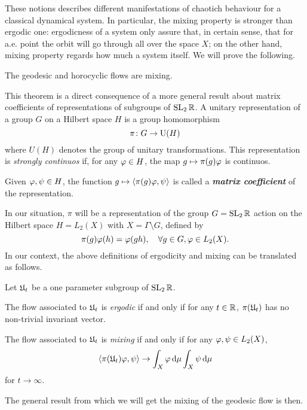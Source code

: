 These notions describes different manifestations of chaotich behaviour for a classical dynamical system. In particular, the mixing property is stronger than ergodic one: ergodicness of a system only assure that, in certain sense, that for a.e. point the orbit will go through all over the space $X$; on the other hand, mixing property regards how much a system  itself. We will prove the following.

\begin{nteo}
\label{teo:geod_horo_are_mixing}
The geodesic and horocyclic flows are mixing.
\end{nteo}

This theorem is a direct consequence of a more general result about matrix coefficients of representations of subgroups of $\operatorname{SL}_{2}\mathbb{R}$. A unitary representation of a group $G$ on a Hilbert space $H$ is a group homomorphism
\[
\pi\colon G\to\operatorname{U}(H)
\]
where $U(H)$ denotes the group of unitary transformations. This representation is \emph{strongly continuos} if, for any $\varphi\in H$, the map $g\mapsto\pi(g)\varphi$ is continuos. 
\begin{defin}
Given $\varphi,\psi\in H$, the function $g\mapsto\left< \pi(g)\varphi,\psi\right>$ is called a \emph{\textbf{matrix coefficient}} of the representation.
\end{defin}
In our situation, $\pi$ will be a representation of the group $G=\operatorname{SL}_{2}\mathbb{R}$ action on the Hilbert space $H=L_{2}(X)$ with $X=\Gamma\setminus G$, defined by 
\[
\pi(g)\varphi(h)=\varphi(gh),\quad\forall g\in G,\varphi\in L_{2}(X).
\]
In our context, the above definitions of ergodicity and mixing can be translated as follows.

\begin{defin}
Let $\mathfrak{U}_{t}$ be a one parameter subgroup of $\operatorname{SL}_{2}\mathbb{R}$.
\begin{compactitem}
\item The flow associated to $\mathfrak{U}_{t}$ is \emph{ergodic} if and only if for any $t\in\mathbb{R}$, $\pi(\mathfrak{U}_{t})$ has no non-trivial invariant vector.
\item The flow associated to $\mathfrak{U}_{t}$ is \emph{mixing} if and only if for any $\varphi,\psi\in L_{2}(X)$,
\[
\left< \pi(\mathfrak{U}_{t})\varphi,\psi\right>\to \int_{X}\varphi\mathop{}\!\mathrm{d}\mu\int_{X}\psi\mathop{}\!\mathrm{d}\mu
\]
for $t\to\infty$.
\end{compactitem}
\end{defin}

The general result from which we will get the mixing of the geodesic flow is then.


